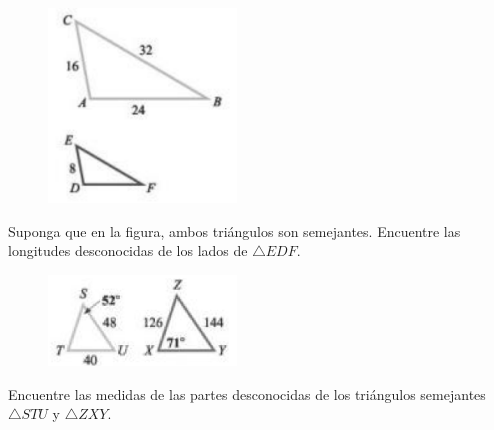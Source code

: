 {}
	\begin{problema}
		\label{exmp:9405}
		\begin{figure}
			\centering
			\includegraphics[width=5cm,keepaspectratio=true]{./trig/trig9446.png}
			\label{fig:9446}
		\end{figure}
		Suponga que en la figura, ambos triángulos son semejantes. Encuentre las longitudes desconocidas de los lados de $\triangle EDF.$
	\end{problema}
	

{}
	\begin{problema}
		\label{exmp:9406}
		\begin{figure}
			\centering
			\includegraphics[width=5cm,keepaspectratio=true]{./trig/trig9447.png}
			\label{fig:9447}
		\end{figure}
		Encuentre las medidas de las partes desconocidas de los triángulos semejantes $\triangle STU$ y $\triangle ZXY.$ 
	\end{problema}
	

